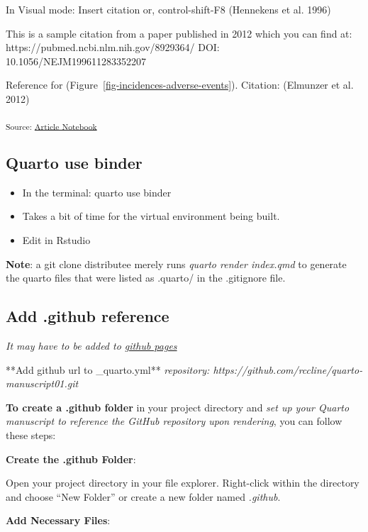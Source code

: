 \documentclass[
  letterpaper,
  DIV=11,
  numbers=noendperiod]{scrartcl}
\providecommand{\tightlist}{%
  \setlength{\itemsep}{0pt}\setlength{\parskip}{0pt}}\usepackage{longtable,booktabs,array}
\begin{document}
In Visual mode: Insert citation or, control-shift-F8 (Hennekens et al.
1996)

This is a sample citation from a paper published in 2012 which you can
find at: https://pubmed.ncbi.nlm.nih.gov/8929364/ DOI:
10.1056/NEJM199611283352207

Reference for (Figure~\ref{fig-incidences-adverse-events}). Citation:
(Elmunzer et al. 2012)

\textsubscript{Source:
\href{https://rccline.github.io/quarto-manuscript01/index.qmd.html}{Article
Notebook}}

\subsection{Quarto use binder}\label{quarto-use-binder}

\begin{itemize}
\tightlist
\item
  In the terminal: quarto use binder\\
\item
  Takes a bit of time for the virtual environment being built.
\item
  Edit in Rstudio
\end{itemize}

\textbf{Note}: a git clone distributee merely runs \emph{quarto render
index.qmd} to generate the quarto files that were listed as .quarto/ in
the .gitignore file.

\subsection{Add .github reference}\label{add-.github-reference}

\emph{It may have to be added to
\href{https://quarto.org/docs/publishing/github-pages.html}{github
pages}}

**Add github url to \_quarto.yml** \emph{repository:
https://github.com/rccline/quarto-manuscript01.git}

\textbf{To create a .github folder} in your project directory and
\emph{set up your Quarto manuscript to reference the GitHub repository
upon rendering}, you can follow these steps:

\textbf{Create the .github Folder}:

Open your project directory in your file explorer. Right-click within
the directory and choose ``New Folder'' or create a new folder named
\emph{.github}.

\textbf{Add Necessary Files}:
\end{document}
